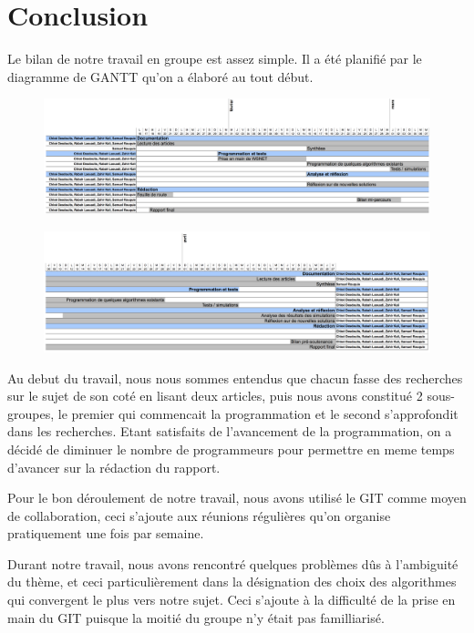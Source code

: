 \chapter{Conclusion}\label{conclusion}
Le bilan de notre travail en groupe est assez simple. Il a été planifié par le diagramme de GANTT qu'on a élaboré au tout début.

\begin{landscape}

\begin{figure}
\centering
\includegraphics[scale=0.98]{Conclusion/diagramme}
\end{figure}

\begin{figure}
\centering
\includegraphics[scale=0.98]{Conclusion/diagramme2}
\end{figure}

\end{landscape}

Au debut du travail, nous nous sommes entendus que chacun fasse des recherches sur le sujet de son coté en lisant deux articles, puis nous avons constitué 2 sous-groupes, le premier qui commencait la programmation et le second s'approfondit dans les recherches. Etant satisfaits de l'avancement de la programmation, on a décidé de diminuer le nombre de programmeurs pour permettre en meme temps d'avancer sur la rédaction du rapport.

Pour le bon déroulement de notre travail, nous avons utilisé le GIT comme moyen de collaboration, ceci s'ajoute aux réunions régulières qu'on organise pratiquement une fois par semaine.

Durant notre travail, nous avons rencontré quelques problèmes dûs à l'ambiguité du thème, et ceci particulièrement dans la désignation des choix des algorithmes qui convergent le plus vers notre sujet. Ceci s'ajoute à la difficulté de la prise en main du GIT puisque la moitié du groupe n'y était pas familliarisé.